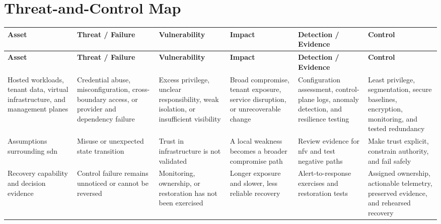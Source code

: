 \documentclass[11pt,letterpaper]{article}
\begin{document}
\section*{Threat-and-Control Map}
\begingroup\scriptsize\setlength{\tabcolsep}{2pt}
\begin{longtable}{>{\raggedright\arraybackslash}p{}>{\raggedright\arraybackslash}p{}>{\raggedright\arraybackslash}p{}>{\raggedright\arraybackslash}p{}>{\raggedright\arraybackslash}p{}>{\raggedright\arraybackslash}p{}}
\toprule\rowcolor{Navy}\color{white}\textbf{Asset} & \color{white}\textbf{Threat / Failure} & \color{white}\textbf{Vulnerability} & \color{white}\textbf{Impact} & \color{white}\textbf{Detection / Evidence} & \color{white}\textbf{Control}\\\midrule
\endfirsthead
\toprule\rowcolor{Navy}\color{white}\textbf{Asset} & \color{white}\textbf{Threat / Failure} & \color{white}\textbf{Vulnerability} & \color{white}\textbf{Impact} & \color{white}\textbf{Detection / Evidence} & \color{white}\textbf{Control}\\\midrule
\endhead
Hosted workloads, tenant data, virtual infrastructure, and management planes & Credential abuse, misconfiguration, cross-boundary access, or provider and dependency failure & Excess privilege, unclear responsibility, weak isolation, or insufficient visibility & Broad compromise, tenant exposure, service disruption, or unrecoverable change & Configuration assessment, control-plane logs, anomaly detection, and resilience testing & Least privilege, segmentation, secure baselines, encryption, monitoring, and tested redundancy\\\midrule
Assumptions surrounding sdn & Misuse or unexpected state transition & Trust in infrastructure is not validated & A local weakness becomes a broader compromise path & Review evidence for nfv and test negative paths & Make trust explicit, constrain authority, and fail safely\\\midrule
Recovery capability and decision evidence & Control failure remains unnoticed or cannot be reversed & Monitoring, ownership, or restoration has not been exercised & Longer exposure and slower, less reliable recovery & Alert-to-response exercises and restoration tests & Assigned ownership, actionable telemetry, preserved evidence, and rehearsed recovery\\\midrule
\bottomrule
\end{longtable}
\endgroup
\end{document}
